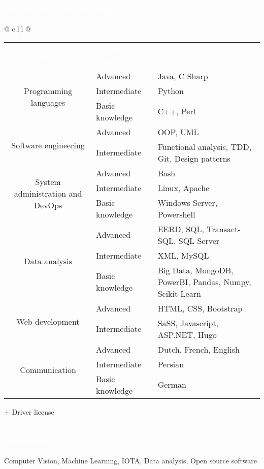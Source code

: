 \documentclass[a4paper, twoside]{article}
\begin{document}
\begin{mdframed}
\section*{\textcolor{white}{ Skills and knowledge }}
\end{mdframed}
\noindent
\begin{tabu}{@{} c|l|l @{}}
\begin{tabular}{c|l|l @{}}
\cellcolor{blueDark}\textcolor{white}{\textbf{ Domain }} &
\cellcolor{blueDark}\textcolor{white}{\textbf{ Proficiency Level }} &
\cellcolor{blueDark}\\
\multirow{ 3 }{*}{ Programming languages }
& Advanced & Java, C Sharp \\
& Intermediate & Python \\
& Basic knowledge & C++, Perl \\
\hline
\multirow{ 2 }{*}{ Software engineering }
& Advanced & OOP, UML \\
& Intermediate & Functional analysis, TDD, Git, Design patterns \\
\hline
\multirow{ 3 }{*}{ System administration and DevOps }
& Advanced & Bash \\
& Intermediate & Linux, Apache \\
& Basic knowledge & Windows Server, Powershell \\
\hline
\multirow{ 3 }{*}{ Data analysis }
& Advanced & EERD, SQL, Transact-SQL, SQL Server \\
& Intermediate & XML, MySQL \\
& Basic knowledge & Big Data, MongoDB, PowerBI, Pandas, Numpy, Scikit-Learn \\
\hline
\multirow{ 2 }{*}{ Web development }
& Advanced & HTML, CSS, Bootstrap \\
& Intermediate & SaSS, Javascript, ASP.NET, Hugo \\
\hline
\multirow{ 3 }{*}{ Communication }
& Advanced & Dutch, French, English \\
& Intermediate & Persian \\
& Basic knowledge & German \\
\hline
\end{tabular}
\end{tabu}
\ignorespaces
\noindent + Driver license
\begin{mdframed}
\section*{\textcolor{white}{ Interests }}
\end{mdframed}
\noindent
Computer Vision, Machine Learning, IOTA, Data analysis, Open source software
\end{document}
